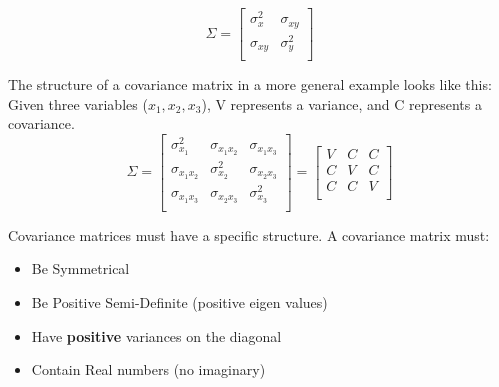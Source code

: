 \[
\Sigma =
\begin{bmatrix}
\sigma_{x}^2 & \sigma_{xy} \\
\sigma_{xy} & \sigma_{y}^2 \\
\end{bmatrix}
\]

The structure of a covariance matrix in a more general example looks like this:
Given three variables ($x_1,x_2,x_3$), V represents a variance, and C represents a covariance.
\[
\Sigma = 
\begin{bmatrix}
\sigma_{x_1}^2 & \sigma_{x_1x_2} & \sigma_{x_1x_3} \\
\sigma_{x_1x_2} & \sigma_{x_2}^2 & \sigma_{x_2x_3} \\
\sigma_{x_1x_3} & \sigma_{x_2x_3} & \sigma_{x_3}^2 \\
\end{bmatrix}
=
\begin{bmatrix}
V & C & C \\
C & V & C \\
C & C & V \\
\end{bmatrix}
\]

Covariance matrices must have a specific structure.  A covariance matrix must:
\begin{itemize}
	\item Be Symmetrical
	\item Be Positive Semi-Definite (positive eigen values)
	\item Have \textbf{positive} variances on the diagonal
	\item Contain Real numbers (no imaginary)
\end{itemize}